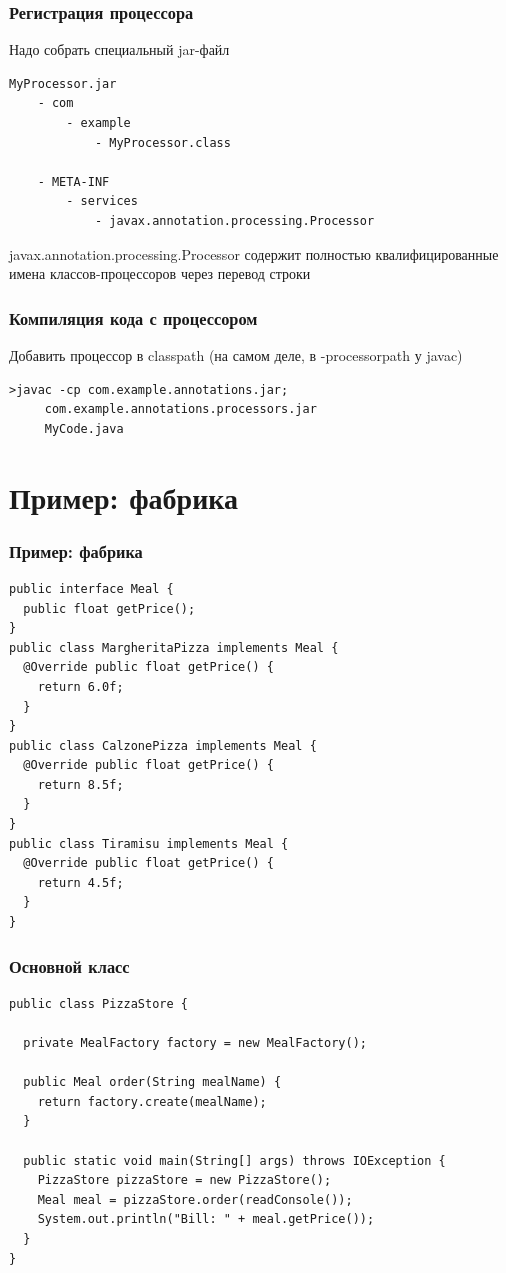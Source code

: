 \documentclass[xetex,mathserif,serif]{beamer}
\begin{document}
	\begin{frame}[fragile]
		\frametitle{Регистрация процессора}
		Надо собрать специальный jar-файл
		\begin{verbatim}
MyProcessor.jar
    - com
        - example
            - MyProcessor.class

    - META-INF
        - services
            - javax.annotation.processing.Processor
		\end{verbatim}
		javax.annotation.processing.Processor содержит полностью квалифицированные имена классов-процессоров через перевод строки
	\end{frame}

	\begin{frame}[fragile]
		\frametitle{Компиляция кода с процессором}
		Добавить процессор в classpath (на самом деле, в -processorpath у javac)
		\vspace{1cm}
		\begin{verbatim}
>javac -cp com.example.annotations.jar;
     com.example.annotations.processors.jar
     MyCode.java
		\end{verbatim}
	\end{frame}

	\section{Пример: фабрика}

		\begin{frame}[fragile]
		\frametitle{Пример: фабрика}
		\begin{footnotesize}
			\begin{verbatim}
public interface Meal {
  public float getPrice();
}
public class MargheritaPizza implements Meal {
  @Override public float getPrice() {
    return 6.0f;
  }
}
public class CalzonePizza implements Meal {
  @Override public float getPrice() {
    return 8.5f;
  }
}
public class Tiramisu implements Meal {
  @Override public float getPrice() {
    return 4.5f;
  }
}
			\end{verbatim}
		\end{footnotesize}
	\end{frame}

	\begin{frame}[fragile]
		\frametitle{Основной класс}
		\begin{small}
			\begin{verbatim}
public class PizzaStore {

  private MealFactory factory = new MealFactory();

  public Meal order(String mealName) {
    return factory.create(mealName);
  }

  public static void main(String[] args) throws IOException {
    PizzaStore pizzaStore = new PizzaStore();
    Meal meal = pizzaStore.order(readConsole());
    System.out.println("Bill: " + meal.getPrice());
  }
}
			\end{verbatim}
		\end{small}
	\end{frame}
\end{document}
